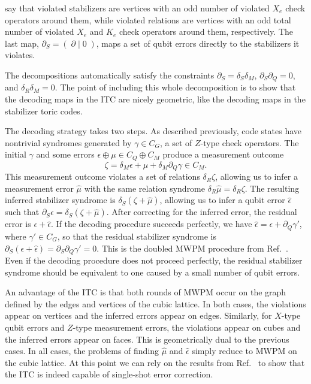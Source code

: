 say that violated stabilizers are vertices with an odd number of violated $X_e$ check operators around them, while violated relations are vertices with an odd total number of violated $X_e$ and $K_e$ check operators around them, respectively.
The last map, $ \partial_S = \left(  \; \partial \; \Big| \; 0 \; \right)$, maps a set of qubit errors directly to the stabilizers it violates. 

The decompositions automatically satisfy the constraints $\partial_S = \delta_S \delta_M$, $\partial_S \partial_Q=0$, and $\delta_R\delta_M = 0$. The point of including this whole decomposition is to show that the decoding maps in the ITC are nicely geometric, like the decoding maps in the stabilizer toric codes.

The decoding strategy takes two steps. As described previously, code states have nontrivial syndromes generated by $\gamma \in C_G$, a set of $Z$-type check operators. The initial $\gamma$ and some errors $\epsilon \oplus \mu \in C_Q \oplus C_M$ produce a 
measurement outcome 
\begin{equation}
\zeta = \delta_M \epsilon + \mu + \delta_M\partial_Q \gamma \in C_M.
\end{equation}
This measurement outcome violates a set of relations $\delta_R \zeta$, allowing us to infer a measurement error $\hat{\mu}$ with the same relation syndrome $\delta_R \hat{\mu} = \delta_R \zeta$. The resulting inferred stabilizer syndrome is $\delta_S (\zeta + \hat\mu)$, allowing us to infer a qubit error $\hat{\epsilon}$ such that $\partial_S \hat{\epsilon} = \delta_S (\zeta + \hat\mu)$. After correcting for the inferred error, the residual error is $\epsilon + \hat \epsilon$. If the decoding procedure succeeds perfectly, we have $\hat\epsilon = \epsilon + \partial_Q \gamma'$, where $\gamma' \in C_G$, so that the residual stabilizer syndrome is $\partial_S(\epsilon + \hat \epsilon) = \partial_S \partial_Q \gamma' = 0$. This is the doubled MWPM procedure from Ref.~\cite{KubicaVasmer2022}. Even if the decoding procedure does not proceed perfectly, the residual stabilizer syndrome should be equivalent to one caused by a small number of qubit errors.

An advantage of the ITC is that both rounds of MWPM occur on the graph defined by the edges and vertices of the cubic lattice. In both cases, the violations appear on vertices and the inferred errors appear on edges. Similarly, for $X$-type qubit errors and $Z$-type measurement errors, the violations appear on cubes and the inferred errors appear on faces.
This is geometrically dual to the previous cases. In all cases, the problems of finding $\hat \mu$ and $\hat \epsilon$ simply reduce to MWPM on the cubic lattice. At this point we can rely on the results from Ref.~\cite{KubicaVasmer2022} to show that the ITC is indeed capable of single-shot error correction.

